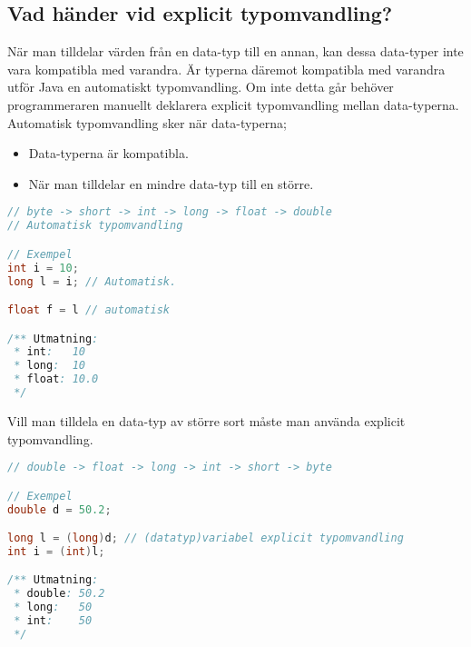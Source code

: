\documentclass[../main.tex]{subfiles}
\begin{document}
\subsection{Vad händer vid explicit typomvandling?}
När man tilldelar värden från en data-typ till en annan, kan dessa data-typer inte vara kompatibla med varandra. Är typerna däremot kompatibla med varandra utför Java en automatiskt typomvandling. Om inte detta går behöver programmeraren manuellt deklarera explicit typomvandling mellan data-typerna.\\

Automatisk typomvandling sker när data-typerna;
\begin{itemize}
    \item Data-typerna är kompatibla.
    \item När man tilldelar en mindre data-typ till en större.
\end{itemize}
\begin{lstlisting}[language=java]
// byte -> short -> int -> long -> float -> double
// Automatisk typomvandling

// Exempel
int i = 10;
long l = i; // Automatisk.

float f = l // automatisk

/** Utmatning:
 * int:   10
 * long:  10
 * float: 10.0
 */
\end{lstlisting}
Vill man tilldela en data-typ av större sort måste man använda explicit typomvandling.
\begin{lstlisting}[language=java]
// double -> float -> long -> int -> short -> byte

// Exempel
double d = 50.2;

long l = (long)d; // (datatyp)variabel explicit typomvandling
int i = (int)l;

/** Utmatning:
 * double: 50.2
 * long:   50
 * int:    50
 */
\end{lstlisting}
\end{document}
